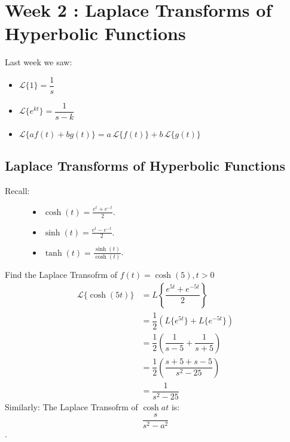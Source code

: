 \documentclass[a4paper]{article}
\theoremstyle{definition}
\theoremstyle{plain}
\begin{document}
\section{Week 2 : Laplace Transforms of Hyperbolic Functions}
Last week we saw: 
\begin{itemize}
  \setlength\itemsep{1pt}
  \item \(\mathcal{L}\{1\} = \dfrac{1}{s}\)
  \item \(\mathcal{L}\{e^{kt}\} = \dfrac{1}{s-k}\)
  \item \(\mathcal{L}\{a f(t) + b g(t)\} = a\,\mathcal{L}\{f(t)\} + b\,\mathcal{L}\{g(t)\}\)
\end{itemize}
\subsection{Laplace Transforms of Hyperbolic Functions}
Recall:
\begin{figure}[htbp]
  \centering
  \begin{minipage}[c]{0.45\textwidth}
  \end{minipage}%
  \hfill
  \begin{minipage}[c]{0.45\textwidth}
    \begin{itemize}
      \item \( \cosh(t) = \frac{e^t + e^{-t}}{2} \).
      \item \( \sinh(t) = \frac{e^t - e^{-t}}{2} \).
      \item \( \tanh(t) = \frac{\sinh(t)}{\cosh(t)} \).
    \end{itemize}
  \end{minipage}
\end{figure}

\begin{examplebox}[Example]
  Find the Laplace Transofrm of $f(t) = \cosh(5),  t > 0$
\begin{align*}
  \mathcal{L}\{\cosh(5t)\} &= L\left\{\dfrac{e^{5t} + e^{-5t}}{2}\right\} \\
  &= \dfrac{1}{2} \left(L\{e^{5t}\} + L\{e^{-5t}\}\right) \\
  &= \dfrac{1}{2} \left(\dfrac{1}{s-5} + \dfrac{1}{s+5}\right) \\
  &= \dfrac{1}{2} \left(\dfrac{s+5 + s-5}{s^2 - 25}\right) \\
  &= \dfrac{1}{s^2 - 25}
\end{align*}
\noindent Similarly: The Laplace Transofrm of $\cosh{at}$ is: $$\dfrac{s}{s^2 - a^2}$$.
\end{examplebox}
\end{document}
